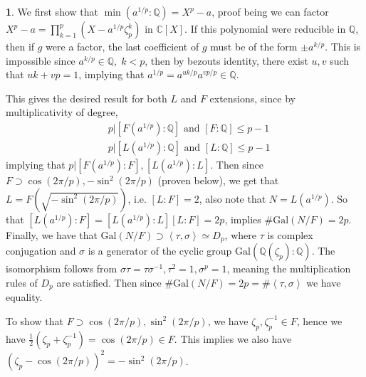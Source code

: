 \documentclass[11pt]{article}
\theoremstyle{definition}
\newtheorem{pb}{}
\newcommand{\gen}[1]{\left\langle #1 \right\rangle}
\newcommand{\tand}{\text{ and }}
\newcommand{\gal}{\text{Gal}}
\begin{document}
    \begin{pb}
        We first show that \(\min(a^{1/p}:\mathbb{Q}) = X^p - a\), proof being we can factor \(X^p - a = \prod_{k=1}^p (X - a^{1/p}\zeta_p^k)\) in \(\mathbb{C}[X]\). If this
        polynomial were reducible in \(\mathbb{Q}\), then if \(g\) were a factor, the last coefficient of \(g\) must be of the form \(\pm a^{k/p}\). This is impossible since
        \(a^{k/p} \in \mathbb{Q}, \; k < p\), then by bezouts identity, there exist \(u,v\) such that \(uk + vp = 1\), implying that \(a^{1/p} = a^{uk/p}a^{vp/p} \in \mathbb{Q}\).

        This gives the desired result for both \(L\) and \(F\) extensions, since by multiplicativity of degree,
        \begin{align*}
            &p \vert [F(a^{1/p}):\mathbb{Q}] \tand [F: \mathbb{Q}] \leq p-1 \\
            &p \vert [L(a^{1/p}):\mathbb{Q}] \tand [L: \mathbb{Q}] \leq p-1
        \end{align*}
        implying that \(p \vert [F(a^{1/p}):F], [L(a^{1/p}):L]\). Then since \(F \supset \cos(2\pi/p), -\sin^2(2\pi/p)\) (proven below), we get that \(L = F(\sqrt{-\sin^2(2\pi/p)})\), i.e. \([L:F] = 2\), also note that
        \(N = L(a^{1/p})\). So that \([L(a^{1/p}):F] = [L(a^{1/p}):L][L:F] = 2p\), implies \(\# \gal(N/F) = 2p\). Finally, we have that
        \(\gal(N/F) \supset \gen{\tau,\sigma} \simeq D_p\), where \(\tau\) is complex conjugation and \(\sigma\) is a generator of the cyclic group \(\gal(\mathbb{Q}(\zeta_p):\mathbb{Q})\). The
        isomorphism follows from \(\sigma\tau = \tau\sigma^{-1}, \tau^2 = 1, \sigma^p = 1\), meaning the multiplication rules of \(D_p\) are satisfied. Then since 
        \(\# \gal(N/F) = 2p = \# \gen{\tau,\sigma}\) we have equality.

        To show that \(F \supset \cos(2\pi/p), \sin^2(2\pi/p)\), we have \(\zeta_p, \zeta_p^{-1} \in F\), hence we have \(\frac12(\zeta_p + \zeta_p^{-1}) = \cos(2\pi/p) \in F\). This implies we also have
        \((\zeta_p - \cos(2\pi/p))^2 = -\sin^2(2\pi/p)\).
    \end{pb}
\end{document}

